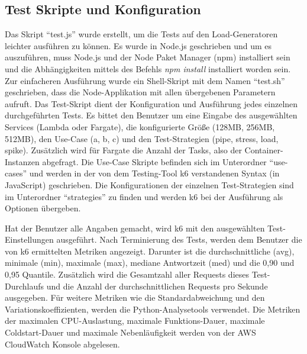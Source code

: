 \subsection{Test Skripte und Konfiguration}
Das Skript "`test.js"' wurde erstellt, um die Tests auf den Load-Generatoren leichter ausführen zu können. Es wurde in Node.js geschrieben und um es auszuführen, muss Node.js und der Node Paket Manager (npm) installiert sein und die Abhängigkeiten mittels des Befehls \textit{npm install} installiert worden sein. Zur einfacheren Ausführung wurde ein Shell-Skript mit dem Namen "`test.sh"' geschrieben, dass die Node-Applikation mit allen übergebenen Parametern aufruft. 
Das Test-Skript dient der Konfiguration und Ausführung jedes einzelnen durchgeführten Tests. Es bittet den Benutzer um eine Eingabe des ausgewählten Services (Lambda oder Fargate), die konfigurierte Größe (128MB, 256MB, 512MB), den Use-Case (a, b, c) und den Test-Strategien (pipe, stress, load, spike). Zusätzlich wird für Fargate die Anzahl der Tasks, also der Container-Instanzen abgefragt. Die Use-Case Skripte befinden sich im Unterordner "`use-cases"' und werden in der von dem Testing-Tool k6 verstandenen Syntax (in JavaScript) geschrieben. Die Konfigurationen der einzelnen Test-Strategien sind im Unterordner "`strategies"' zu finden und werden k6 bei der Ausführung als Optionen übergeben.

Hat der Benutzer alle Angaben gemacht, wird k6 mit den ausgewählten Test-Einstellungen ausgeführt. Nach Terminierung des Tests, werden dem Benutzer die von k6 ermittelten Metriken angezeigt. Darunter ist die durchschnittliche (avg), minimale (min), maximale (max), mediane Antwortzeit (med) und die 0,90 und 0,95 Quantile. Zusätzlich wird die Gesamtzahl aller Requests dieses Test-Durchlaufs und die Anzahl der durchschnittlichen Requests pro Sekunde ausgegeben. Für weitere Metriken wie die Standardabweichung und den Variationskoeffizienten, werden die Python-Analysetools verwendet. Die Metriken der maximalen CPU-Auslastung, maximale Funktions-Dauer, maximale Coldstart-Dauer und maximale Nebenläufigkeit werden von der AWS CloudWatch Konsole abgelesen.
